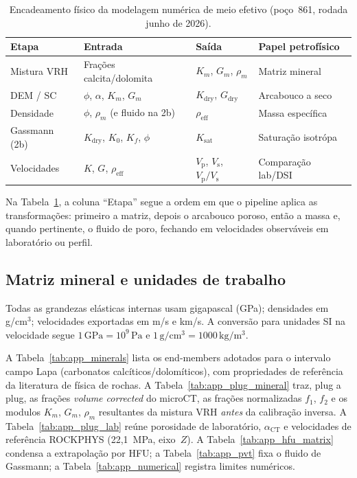 \documentclass[11pt,a4paper]{article}
\numberwithin{equation}{section}
\newcommand{\Vp}{\ensuremath{V_{\mathrm{p}}}}
\newcommand{\Vs}{\ensuremath{V_{\mathrm{s}}}}
\newcommand{\VpVs}{\ensuremath{V_{\mathrm{p}}/V_{\mathrm{s}}}}
\begin{document}
\begin{table}[H]
  \centering
  \caption{Encadeamento físico da modelagem numérica de meio efetivo
           (poço~861, rodada junho de 2026).}
  \label{tab:app_chain}
  \small
  \begin{tabular}{p{2.8cm}p{3.2cm}p{3.2cm}p{4.5cm}}
    \toprule
    Etapa & Entrada & Saída & Papel petrofísico \\
    \midrule
    Mistura VRH & Frações calcita/dolomita & $K_m$, $G_m$, $\rho_m$ & Matriz mineral \\
    DEM / SC & $\phi$, $\alpha$, $K_m$, $G_m$ & $K_{\mathrm{dry}}$, $G_{\mathrm{dry}}$ & Arcabouco a seco \\
    Densidade & $\phi$, $\rho_m$ (e fluido na 2b) & $\rho_{\mathrm{eff}}$ & Massa específica \\
    Gassmann (2b) & $K_{\mathrm{dry}}$, $K_0$, $K_f$, $\phi$ & $K_{\mathrm{sat}}$ & Saturação isotrópa \\
    Velocidades & $K$, $G$, $\rho_{\mathrm{eff}}$ & \Vp, \Vs, \VpVs & Comparação lab/DSI \\
    \bottomrule
  \end{tabular}
\end{table}

Na Tabela~\ref{tab:app_chain}, a coluna ``Etapa'' segue a ordem em que o
pipeline aplica as transformações: primeiro a matriz, depois o arcabouco poroso,
então a massa e, quando pertinente, o fluido de poro, fechando em
velocidades observáveis em laboratório ou perfil.

\subsection{Matriz mineral e unidades de trabalho}

Todas as grandezas elásticas internas usam gigapascal (GPa); densidades em
g/cm$^3$; velocidades exportadas em m/s e km/s.
A conversão para unidades SI na velocidade segue
$1\,\mathrm{GPa} = 10^9\,\mathrm{Pa}$ e
$1\,\mathrm{g/cm^3} = 1000\,\mathrm{kg/m^3}$.

A Tabela~\ref{tab:app_minerals} lista os end-members adotados para o intervalo
campo Lapa (carbonatos calcíticos/dolomíticos), com propriedades de referência
da literatura de física de rochas.
A Tabela~\ref{tab:app_plug_mineral} traz, plug a plug, as frações
\textit{volume corrected} do microCT, as frações normalizadas $f_1$, $f_2$ e
os modulos $K_m$, $G_m$, $\rho_m$ resultantes da mistura VRH \emph{antes} da
calibração inversa.
A Tabela~\ref{tab:app_plug_lab} reúne porosidade de laboratório, $\alpha_{\mathrm{CT}}$
e velocidades de referência ROCKPHYS (22,1~MPa, eixo~$Z$).
A Tabela~\ref{tab:app_hfu_matrix} condensa a extrapolação por HFU; a
Tabela~\ref{tab:app_pvt} fixa o fluido de Gassmann; a
Tabela~\ref{tab:app_numerical} registra limites numéricos.
\end{document}
